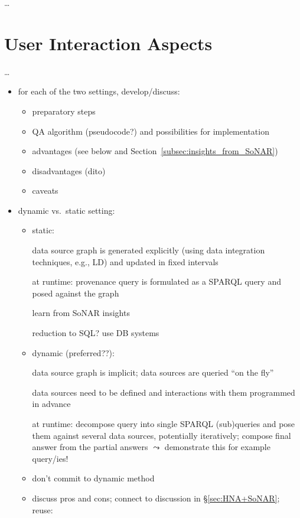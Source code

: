\dots



\section{User Interaction Aspects}
\label{sec:user_interaction}

\dots



\begin{itemize}
  \item
    for each of the two settings, develop/discuss:
    \begin{itemize}
      \item
        preparatory steps
      \item
        QA algorithm (pseudocode?) and possibilities for implementation
      \item
        advantages (see below and Section~\ref{subsec:insights_from_SoNAR})
      \item
        disadvantages (dito)
      \item
        caveats
    \end{itemize}
  \item
    dynamic vs.\ static setting:
    \begin{itemize}
      \item
        static: 
        
        data source graph is generated explicitly (using data integration techniques, e.g., LD)
        and updated in fixed intervals
                
        at runtime: provenance query is formulated as a \gls{SPARQL} query and posed against the graph
        
        learn from SoNAR insights
        
        reduction to SQL? use DB systems
      \item
        dynamic (preferred??):
        
        data source graph is implicit; data sources are queried \enquote{on the fly}
        
        data sources need to be defined and
        interactions with them programmed in advance
        
        at runtime: decompose query into single \gls{SPARQL} (sub)queries and pose them against several data sources,
        potentially iteratively;
        compose final answer from the partial answers
        $\leadsto$ demonstrate this for example query/ies!
      \item
        don't commit to dynamic method %
      \item
        discuss pros and cons; connect to discussion in §\ref{sec:HNA+SoNAR}; reuse:
        

\end{itemize}
\end{itemize}
